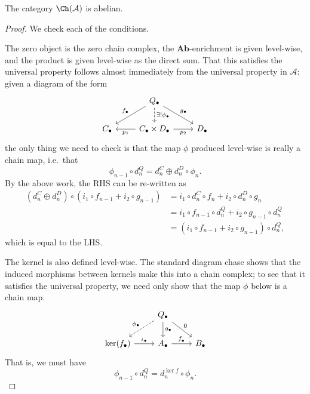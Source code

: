 \documentclass[main.tex]{subfiles}
\begin{document}
\begin{theorem}
  \label{thm:category_of_chain_complexes_is_abelian}
  The category $\Ch(\mathcal{A})$ is abelian.
\end{theorem}
\begin{proof}
  We check each of the conditions.

  The zero object is the zero chain complex, the $\mathbf{Ab}$-enrichment is given level-wise, and the product is given level-wise as the direct sum. That this satisfies the universal property follows almost immediately from the universal property in $\mathcal{A}$: given a diagram of the form
  \begin{equation*}
    \begin{tikzcd}
      & Q_{\bullet}
      \arrow[dr, "g_{\bullet}"]
      \arrow[dl, swap, "f_{\bullet}"]
      \arrow[d, dashed, "\exists!\phi_{\bullet}"]
      \\
      C_{\bullet}
      & C_{\bullet} \times D_{\bullet}
      \arrow[r, swap, "p_{2}"]
      \arrow[l, "p_{1}"]
      & D_{\bullet}
    \end{tikzcd}
  \end{equation*}
  the only thing we need to check is that the map $\phi$ produced level-wise is really a chain map, i.e.\ that
  \begin{equation*}
    \phi_{n-1} \circ d_{n}^{Q} = d_{n}^{C} \oplus d_{n}^{D} \circ \phi_{n}.
  \end{equation*}
  By the above work, the RHS can be re-written as
  \begin{align*}
    (d^{C}_{n} \oplus d^{D}_{n}) \circ (i_{1} \circ f_{n-1} + i_{2} \circ g_{n-1}) &= i_{1} \circ d_{n}^{C} \circ f_{n} + i_{2} \circ d_{n}^{D} \circ g_{n} \\
    &= i_{1} \circ f_{n-1} \circ d^{Q}_{n} + i_{2} \circ g_{n-1} \circ d^{Q}_{n} \\
    &= (i_{1} \circ f_{n-1} + i_{2} \circ g_{n-1}) \circ d^{Q}_{n},
  \end{align*}
  which is equal to the LHS.

  The kernel is also defined level-wise. The standard diagram chase shows that the induced morphisms between kernels make this into a chain complex; to see that it satisfies the universal property, we need only show that the map $\phi$ below is a chain map.
  \begin{equation*}
    \begin{tikzcd}
      & Q_{\bullet}
      \arrow[dr, "0"]
      \arrow[d, "g_{\bullet}"]
      \arrow[dl, swap, dashed, "\phi_{\bullet}"]
      \\
      \ker(f_{\bullet})
      \arrow[r, "\iota_{\bullet}"]
      & A_{\bullet}
      \arrow[r, "f_{_{\bullet}}"]
      & B_{\bullet}
    \end{tikzcd}
  \end{equation*}
  That is, we must have
  \begin{equation}
    \label{eq:needstocommute}
    \phi_{n-1} \circ d^{Q}_{n} = d_{n}^{\ker f} \circ \phi_{n}.
  \end{equation}


\end{proof}
\end{document}
